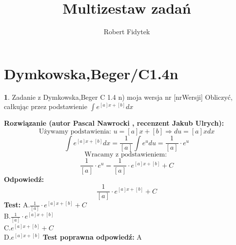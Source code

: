\documentclass[12pt, a4paper]{article}
\title{Multizestaw zadań}
\author{Robert Fidytek}
\date{}
\theoremstyle{definition} %
\newtheorem{zad}{}
\newcommand{\kategoria}[1]{\section{#1}} %
\newcommand{\zadStart}[1]{\begin{zad}#1\newline} %
\newcommand{\zadStop}{\end{zad}}   %
\newcommand{\rozwStart}[2]{\noindent \textbf{Rozwiązanie (autor #1 , recenzent #2): }\newline} %
\newcommand{\odpStart}{\noindent \textbf{Odpowiedź:}\newline}    %
\newcommand{\odpStop}{\newline}                                             %
\newcommand{\testStart}{\noindent \textbf{Test:}\newline} %
\newcommand{\testStop}{\newline} %
\newcommand{\kluczStart}{\noindent \textbf{Test poprawna odpowiedź:}\newline} %
\newcommand{\kluczStop}{\newline} %
\begin{document}
\maketitle



\kategoria{Dymkowska,Beger/C1.4n}
\zadStart{Zadanie z Dymkowska,Beger C 1.4 n) moja wersja nr [nrWersji]}
Obliczyć, całkując przez podstawienie $\displaystyle \int e^{[a]x+[b]}dx$
\zadStop
\rozwStart{Pascal Nawrocki}{Jakub Ulrych}
$$\text{Używamy podstawienia: }u=[a]x+[b]\Rightarrow du=[a]xdx$$
$$\displaystyle \int e^{[a]x+[b]}dx=\displaystyle \frac{1}{[a]}\int e^{u}du=\frac{1}{[a]}\cdot e^{u}$$
$$\text{Wracamy z podstawieniem: }$$
$$\frac{1}{[a]}\cdot e^{u}=\frac{1}{[a]}\cdot e^{[a]x+[b]}+C$$
\odpStart
$$\frac{1}{[a]}\cdot e^{[a]x+[b]}+C$$
\odpStop
\testStart
A.$\frac{1}{[a]}\cdot e^{[a]x+[b]}+C$
\\
B.$\frac{1}{[a]}\cdot e^{[a]x+[b]}$
\\
C.$e^{[a]x+[b]}+C$
\\
D.$e^{[a]x+[b]}$
\testStop
\kluczStart
A
\kluczStop
\end{document}
